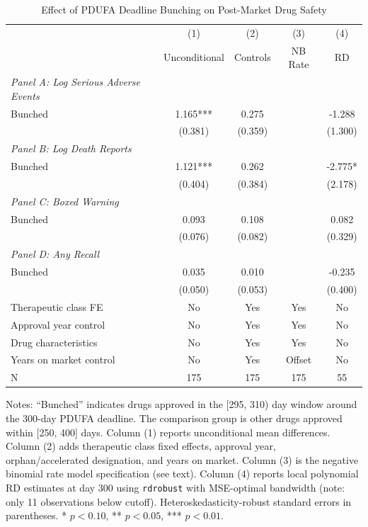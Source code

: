 \begin{table}[H]
\centering
\caption{Effect of PDUFA Deadline Bunching on Post-Market Drug Safety}
\begin{threeparttable}
\begin{tabular}{lcccc}
\toprule
 & (1) & (2) & (3) & (4) \\
 & Unconditional & Controls & NB Rate & RD \\
\midrule
\emph{Panel A: Log Serious Adverse Events} & & & & \\
Bunched & 1.165*** & 0.275 & & -1.288 \\
 & (0.381) & (0.359) & & (1.300) \\
\addlinespace
\emph{Panel B: Log Death Reports} & & & & \\
Bunched & 1.121*** & 0.262 & & -2.775* \\
 & (0.404) & (0.384) & & (2.178) \\
\addlinespace
\emph{Panel C: Boxed Warning} & & & & \\
Bunched & 0.093 & 0.108 & & 0.082 \\
 & (0.076) & (0.082) & & (0.329) \\
\addlinespace
\emph{Panel D: Any Recall} & & & & \\
Bunched & 0.035 & 0.010 & & -0.235 \\
 & (0.050) & (0.053) & & (0.400) \\
\midrule
Therapeutic class FE & No & Yes & Yes & No \\
Approval year control & No & Yes & Yes & No \\
Drug characteristics & No & Yes & Yes & No \\
Years on market control & No & Yes & Offset & No \\
N & 175 & 175 & 175 & 55 \\
\bottomrule
\end{tabular}
\begin{tablenotes}[flushleft]
\small
\item Notes: ``Bunched'' indicates drugs approved in the [295, 310) day window around the 300-day PDUFA deadline. The comparison group is other drugs approved within [250, 400] days. Column (1) reports unconditional mean differences. Column (2) adds therapeutic class fixed effects, approval year, orphan/accelerated designation, and years on market. Column (3) is the negative binomial rate model specification (see text). Column (4) reports local polynomial RD estimates at day 300 using \texttt{rdrobust} with MSE-optimal bandwidth (note: only 11 observations below cutoff). Heteroskedasticity-robust standard errors in parentheses. * $p<0.10$, ** $p<0.05$, *** $p<0.01$.
\end{tablenotes}
\end{threeparttable}
\label{tab:main}
\end{table}
